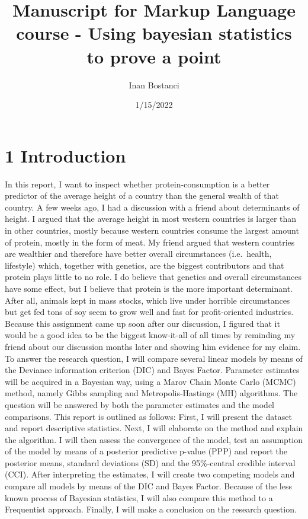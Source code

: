 \documentclass[
]{article}
\title{Manuscript for Markup Language course - Using bayesian statistics
to prove a point}
\author{Inan Bostanci}
\date{1/15/2022}
\begin{document}
\maketitle

\hypertarget{introduction}{%
\section{1 Introduction}\label{introduction}}

In this report, I want to inspect whether protein-consumption is a
better predictor of the average height of a country than the general
wealth of that country. A few weeks ago, I had a discussion with a
friend about determinants of height. I argued that the average height in
most western countries is larger than in other countries, mostly because
western countries consume the largest amount of protein, mostly in the
form of meat. My friend argued that western countries are wealthier and
therefore have better overall circumstances (i.e.~health, lifestyle)
which, together with genetics, are the biggest contributors and that
protein plays little to no role. I do believe that genetics and overall
circumstances have some effect, but I believe that protein is the more
important determinant. After all, animals kept in mass stocks, which
live under horrible circumstances but get fed tons of soy seem to grow
well and fast for profit-oriented industries. Because this assignment
came up soon after our discussion, I figured that it would be a good
idea to be the biggest know-it-all of all times by reminding my friend
about our discussion months later and showing him evidence for my
claim.\\
To answer the research question, I will compare several linear models by
means of the Deviance information criterion (DIC) and Bayes Factor.
Parameter estimates will be acquired in a Bayesian way, using a Marov
Chain Monte Carlo (MCMC) method, namely Gibbs sampling and
Metropolis-Hastings (MH) algorithms. The question will be answered by
both the parameter estimates and the model comparisons. This report is
outlined as follows: First, I will present the dataset and report
descriptive statistics. Next, I will elaborate on the method and explain
the algorithm. I will then assess the convergence of the model, test an
assumption of the model by means of a posterior predictive p-value (PPP)
and report the posterior means, standard deviations (SD) and the
95\%-central credible interval (CCI). After interpreting the estimates,
I will create two competing models and compare all models by means of
the DIC and Bayes Factor. Because of the less known process of Bayesian
statistics, I will also compare this method to a Frequentist approach.
Finally, I will make a conclusion on the research question.
\end{document}

